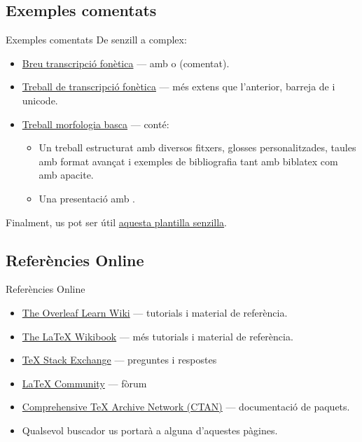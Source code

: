 \subsection{Exemples comentats}
\begin{frame}{Exemples comentats}
De senzill a complex:
\begin{itemize}
    \item \href{https://www.overleaf.com/read/rgxbsfvqsgbw\#ba04b9}{Breu transcripció fonètica} --- amb  o  (comentat). 
    \item \href{https://www.overleaf.com/read/mxysfjcnnppm\#294a25}{Treball de transcripció fonètica} --- més extens que l'anterior, barreja de  i unicode.
    \item \href{https://www.overleaf.com/read/sxkcdfrpmbcb\#10abd3}{Treball morfologia basca} --- conté:
\begin{itemize}
    \item Un treball estructurat amb diversos fitxers, glosses personalitzades, taules amb format avançat i exemples de bibliografia tant amb biblatex com amb apacite.
    \item Una presentació amb .
\end{itemize}
\end{itemize}

Finalment, us pot ser útil \href{https://www.overleaf.com/read/vsdvmbzywdrn\#d43fce}{aquesta plantilla senzilla}.

\end{frame}

\subsection{Referències Online}
\begin{frame}{Referències Online}
\begin{itemize}
\item \href{https://www.overleaf.com/learn}{The Overleaf Learn Wiki} --- tutorials i material de referència.
\item \href{http://en.wikibooks.org/wiki/LaTeX}{The \LaTeX{} Wikibook} --- més tutorials i material de referència.
\item \href{http://tex.stackexchange.com/}{\TeX{} Stack Exchange} --- preguntes i respostes 
\item \href{http://www.latex-community.org/}{\LaTeX{} Community} --- fòrum 
\item \href{http://ctan.org/}{Comprehensive \TeX{} Archive Network (CTAN)} --- documentació de paquets.
\item Qualsevol buscador us portarà a alguna d'aquestes pàgines.
\end{itemize}
\end{frame}




